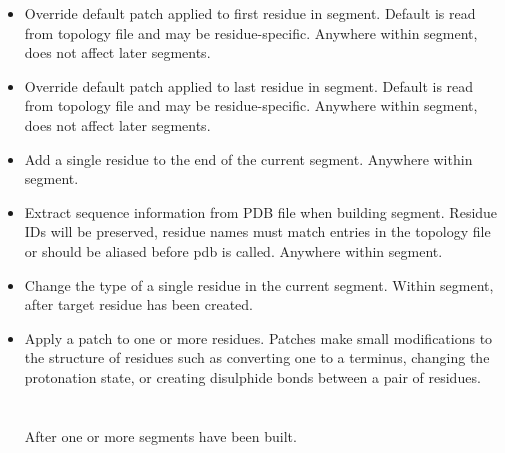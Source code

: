 \begin{itemize}
\item {}
{Override default patch applied to first residue in segment.
Default is read from topology file and may be residue-specific.}
{}
{Anywhere within segment, does not affect later segments.}

\item {}
{Override default patch applied to last residue in segment.
Default is read from topology file and may be residue-specific.}
{}
{Anywhere within segment, does not affect later segments.}

\item {}
{Add a single residue to the end of the current segment.}
{
}
{Anywhere within segment.}

\item {}
{Extract sequence information from PDB file when building segment.
Residue IDs will be preserved, residue names must match entries in
the topology file or should be aliased before pdb is called.}
{}
{Anywhere within segment.}

\item {}
{Change the type of a single residue in the current segment.}
{
}
{Within segment, after target residue has been created.}

\item {}
{Apply a patch to one or more residues.  Patches make small modifications to
the structure of residues such as converting one to a terminus, changing the
protonation state, or creating disulphide bonds between a pair of residues.}
{\\
\\
\\
}
{After one or more segments have been built.}


\end{itemize}
